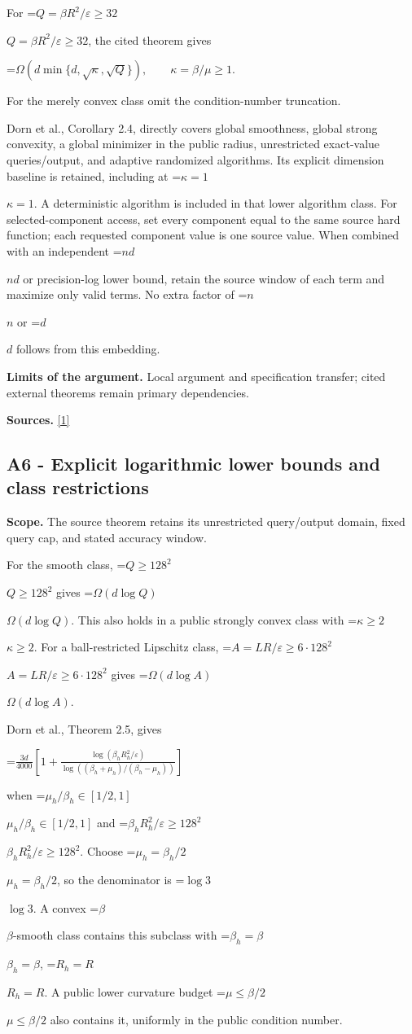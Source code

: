 \documentclass[10pt,a4paper]{article}
\newcommand{\AtlasMath}[1]{\par\begingroup\centering\setbox0=\hbox{$\displaystyle #1$}\ifdim\wd0>1.4\linewidth\typeout{ATLAS WIDE FORMULA: \the\wd0}\fi\ifdim\wd0>\linewidth\resizebox{\linewidth}{!}{\box0}\else\box0\fi\par\endgroup}
\newcommand{\AtlasInlineMath}[1]{\begingroup\setbox0=\hbox{$#1$}\ifdim\wd0>.4\linewidth\endgroup\AtlasMath{#1}\else\endgroup$#1$\fi}
\begin{document}
For \AtlasInlineMath{Q=\beta R^2/\varepsilon\ge32}, the cited theorem gives

\AtlasMath{\Omega\!\left(d\min\{d,\sqrt\kappa,\sqrt Q\}\right),\qquad\kappa=\beta/\mu\ge1.}

For the merely convex class omit the condition-number truncation.

Dorn et al., Corollary 2.4, directly covers global smoothness, global strong convexity, a global minimizer in the public radius, unrestricted exact-value queries/output, and adaptive randomized algorithms. Its explicit dimension baseline is retained, including at \AtlasInlineMath{\kappa=1}. A deterministic algorithm is included in that lower algorithm class. For selected-component access, set every component equal to the same source hard function; each requested component value is one source value. When combined with an independent \AtlasInlineMath{nd} or precision-log lower bound, retain the source window of each term and maximize only valid terms. No extra factor of \AtlasInlineMath{n} or \AtlasInlineMath{d} follows from this embedding.

\textbf{Limits of the argument.} Local argument and specification transfer; cited external theorems remain primary dependencies.

\textbf{Sources.} \href{https://arxiv.org/html/2610.00345v1}{[1]}

\subsection{A6 - Explicit logarithmic lower bounds and class restrictions}
\textbf{Scope.} The source theorem retains its unrestricted query/output domain, fixed query cap, and stated accuracy window.

For the smooth class, \AtlasInlineMath{Q\ge128^2} gives \AtlasInlineMath{\Omega(d\log Q)}. This also holds in a public strongly convex class with \AtlasInlineMath{\kappa\ge2}. For a ball-restricted Lipschitz class, \AtlasInlineMath{A=LR/\varepsilon\ge6\cdot128^2} gives \AtlasInlineMath{\Omega(d\log A)}.

Dorn et al., Theorem 2.5, gives

\AtlasMath{\frac{3d}{4000}\left[1+\frac{\log(\beta_hR_h^2/\varepsilon)}{\log((\beta_h+\mu_h)/(\beta_h-\mu_h))}\right]}

when \AtlasInlineMath{\mu_h/\beta_h\in[1/2,1]} and \AtlasInlineMath{\beta_hR_h^2/\varepsilon\ge128^2}. Choose \AtlasInlineMath{\mu_h=\beta_h/2}, so the denominator is \AtlasInlineMath{\log3}. A convex \AtlasInlineMath{\beta}-smooth class contains this subclass with \AtlasInlineMath{\beta_h=\beta}, \AtlasInlineMath{R_h=R}. A public lower curvature budget \AtlasInlineMath{\mu\le\beta/2} also contains it, uniformly in the public condition number.
\end{document}
